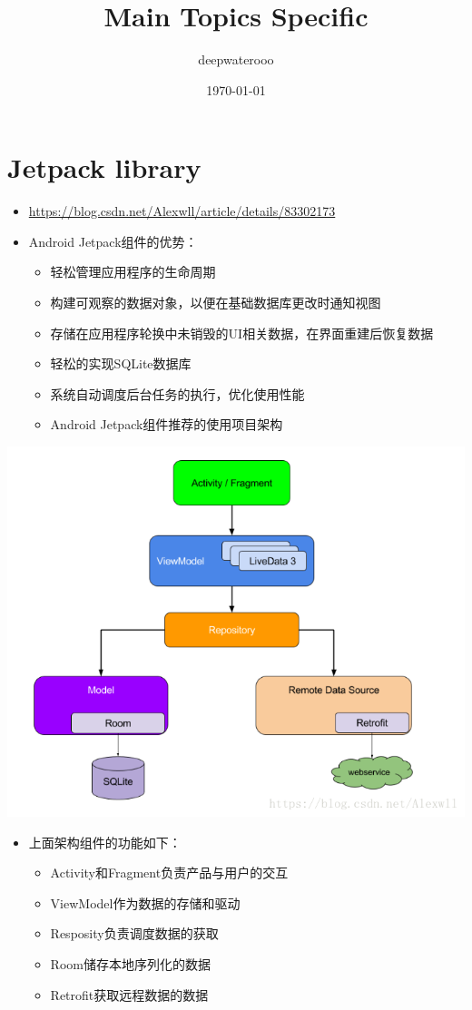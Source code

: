 \documentclass[9pt, b5paper]{article}
\author{deepwaterooo}
\date{\today}
\title{Main Topics Specific}
\begin{document}
\maketitle
\tableofcontents


\section{Jetpack library}
\label{sec-1}
\begin{itemize}
\item \url{https://blog.csdn.net/Alexwll/article/details/83302173}
\item Android Jetpack组件的优势：
\begin{itemize}
\item 轻松管理应用程序的生命周期
\item 构建可观察的数据对象，以便在基础数据库更改时通知视图
\item 存储在应用程序轮换中未销毁的UI相关数据，在界面重建后恢复数据
\item 轻松的实现SQLite数据库
\item 系统自动调度后台任务的执行，优化使用性能
\item Android Jetpack组件推荐的使用项目架构
\end{itemize}
\end{itemize}

\includegraphics[width=.9\linewidth]{./pic/jetpack.png}

\begin{itemize}
\item 上面架构组件的功能如下：
\begin{itemize}
\item Activity和Fragment负责产品与用户的交互
\item ViewModel作为数据的存储和驱动
\item Resposity负责调度数据的获取
\item Room储存本地序列化的数据
\item Retrofit获取远程数据的数据
\end{itemize}
\end{itemize}
\end{document}
